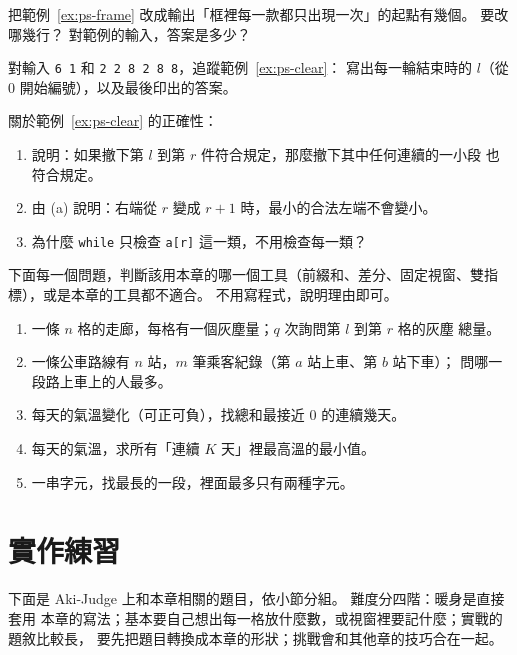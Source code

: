 \begin{drills}[label=drills:ch5]
\item 把範例~\ref{ex:ps-frame} 改成輸出「框裡每一款都只出現一次」的起點有幾個。
要改哪幾行？ 對範例的輸入，答案是多少？

\item 對輸入 \texttt{6 1} 和 \texttt{2 2 8 2 8 8}，追蹤範例~\ref{ex:ps-clear}：
寫出每一輪結束時的 $l$（從 $0$ 開始編號），以及最後印出的答案。

\item 關於範例~\ref{ex:ps-clear} 的正確性：
\begin{enumerate}
\item 說明：如果撤下第 $l$ 到第 $r$ 件符合規定，那麼撤下其中任何連續的一小段
也符合規定。
\item 由 (a) 說明：右端從 $r$ 變成 $r + 1$ 時，最小的合法左端不會變小。
\item 為什麼 \texttt{while} 只檢查 \texttt{a[r]} 這一類，不用檢查每一類？
\end{enumerate}

\item 下面每一個問題，判斷該用本章的哪一個工具（前綴和、差分、固定視窗、雙指
標），或是本章的工具都不適合。 不用寫程式，說明理由即可。
\begin{enumerate}
\item 一條 $n$ 格的走廊，每格有一個灰塵量；$q$ 次詢問第 $l$ 到第 $r$ 格的灰塵
總量。
\item 一條公車路線有 $n$ 站，$m$ 筆乘客紀錄（第 $a$ 站上車、第 $b$ 站下車）；
問哪一段路上車上的人最多。
\item 每天的氣溫變化（可正可負），找總和最接近 $0$ 的連續幾天。
\item 每天的氣溫，求所有「連續 $K$ 天」裡最高溫的最小值。
\item 一串字元，找最長的一段，裡面最多只有兩種字元。
\end{enumerate}
\end{drills}

\section{實作練習}
\label{sec:ch5-practice}

下面是 Aki-Judge 上和本章相關的題目，依小節分組。 難度分四階：暖身是直接套用
本章的寫法；基本要自己想出每一格放什麼數，或視窗裡要記什麼；實戰的題敘比較長，
要先把題目轉換成本章的形狀；挑戰會和其他章的技巧合在一起。

